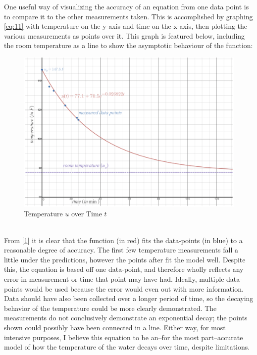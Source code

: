 \documentclass[10pt]{article}
\begin{document}
One useful way of visualizing the accuracy of an equation from one data point is to compare it to the other measurements taken. This is accomplished by graphing \eqref{eq:11} with temperature on the y-axis and time on the x-axis, then plotting the various measurements as points over it. This graph is featured below, including the room temperature as a line to show the asymptotic behaviour of the function:
	\begin{figure}[h!]
	\begin{center}
		\includegraphics[scale=.3]{graphheat}
		\caption{Temperature $u$ over Time $t$}
		\label{fig:2}
	\end{center}
	\end{figure} \\
From [\ref{fig:2}] it is clear that the function (in red) fits the data-points (in blue) to a reasonable degree of accuracy. The first few temperature measurements fall a little under the predictions, however the points after fit the model well. Despite this, the equation is based off one data-point, and therefore wholly reflects any error in measurement or time that point may have had. Ideally, multiple data-points would be used because the error would even out with more information. Data should have also been collected over a longer period of time, so the decaying behavior of the temperature could be more clearly demonstrated. The measurements do not conclusively demonstrate an exponential decay; the points shown could possibly have been connected in a line. Either way, for most intensive purposes, I believe this equation to be an--for the most part--accurate model of how the temperature of the water decays over time, despite limitations.
\end{document}
